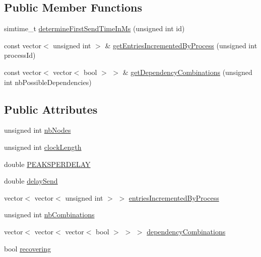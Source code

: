 \subsection*{Public Member Functions}
\begin{DoxyCompactItemize}
\item 
simtime\+\_\+t \hyperlink{class_simulation_parameters_acf83b84e172a799e1db3bf9554c4787f}{determine\+First\+Send\+Time\+In\+Ms} (unsigned int id)
\item 
const vector$<$ unsigned int $>$ \& \hyperlink{class_simulation_parameters_aec302fa13d17be02d116829100ccbf70}{get\+Entries\+Incremented\+By\+Process} (unsigned int process\+Id)
\item 
const vector$<$ vector$<$ bool $>$ $>$ \& \hyperlink{class_simulation_parameters_a39008b8c9ed5c7c27dbfe7c5355d8062}{get\+Dependency\+Combinations} (unsigned int nb\+Possible\+Dependencies)
\end{DoxyCompactItemize}
\subsection*{Public Attributes}
\begin{DoxyCompactItemize}
\item 
unsigned int \hyperlink{class_simulation_parameters_a96391a1b611de11ca4d0babba7117872}{nb\+Nodes}
\item 
unsigned int \hyperlink{class_simulation_parameters_a34b25081ba9b20aa461c03ab3ade034b}{clock\+Length}
\item 
double \hyperlink{class_simulation_parameters_a57cd536ac7c057b5c2d5c85faa4d846d}{P\+E\+A\+K\+S\+P\+E\+R\+D\+E\+L\+AY}
\item 
double \hyperlink{class_simulation_parameters_ae02521fdf6d81eff5e620a6a021106d3}{delay\+Send}
\item 
vector$<$ vector$<$ unsigned int $>$ $>$ \hyperlink{class_simulation_parameters_a069a04754400916fc6b5f9f5baff2d32}{entries\+Incremented\+By\+Process}
\item 
unsigned int \hyperlink{class_simulation_parameters_a8f1c0671b131ea807d8a04cd9b15d9b8}{nb\+Combinations}
\item 
vector$<$ vector$<$ vector$<$ bool $>$ $>$ $>$ \hyperlink{class_simulation_parameters_a1e884901020cad738db1aceaa6700d9f}{dependency\+Combinations}
\item 
bool \hyperlink{class_simulation_parameters_a637db4137ba6b25de7e75db1582d6532}{recovering}
\end{DoxyCompactItemize}
